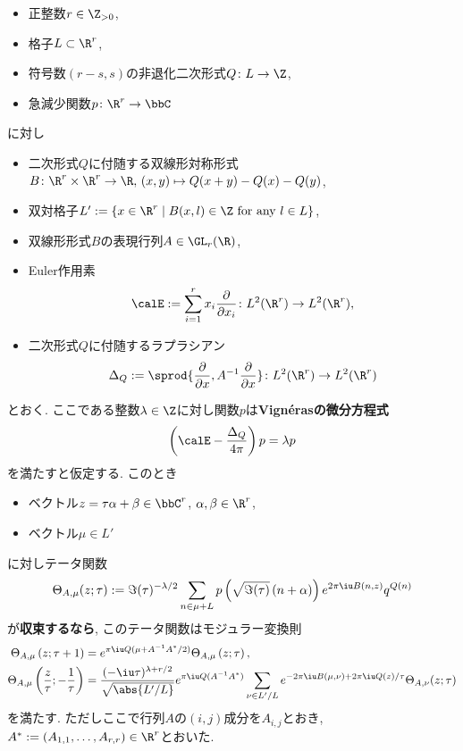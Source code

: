 \documentclass[11pt,b5paper,oneside,lualatex]{ltjsarticle} %
\numberwithin{equation}{section} %
\begin{document}
\begin{thm}
	\label{thm:Vigneras}
	\leavevmode %
	\begin{itemize}
		\item 正整数$ r \in \Z_{>0} $,
		\item 格子$ L \subset \R^r $,
		\item 符号数$ (r-s, s) $の非退化二次形式$ Q \colon L \to \Z $,
		\item 急減少関数$ p \colon \R^r \to \bbC $
	\end{itemize}
	に対し
	\begin{itemize}
		\item 二次形式$ Q $に付随する双線形対称形式$ B \colon \R^r \times \R^r \to \R, \, (x, y) \mapsto Q(x+y) - Q(x) - Q(y) $,
		\item 双対格子$ L' := \{ x \in \R^r \mid B(x, l) \in \Z \text{ for any } l \in L \} $,
		\item 双線形形式$ B $の表現行列$ A \in \GL_r(\R) $,
		\item Euler作用素
		\[
		\calE := \sum_{i=1}^{r} x_i \frac{\partial}{\partial x_i}
		\colon L^2(\R^r) \to L^2(\R^r),
		\]
		\item 二次形式$ Q $に付随するラプラシアン
		\[
		\Delta_Q := \sprod{ \frac{\partial}{\partial x}, A^{-1} \frac{\partial}{\partial x} }
		\colon L^2(\R^r) \to L^2(\R^r)
		\]
	\end{itemize}
	とおく. 
	ここである整数$ \lambda \in \Z $に対し関数$ p $は\textbf{Vign\'{e}rasの微分方程式}
	\[
	\left( \calE - \frac{\Delta_Q}{4\pi} \right) p = \lambda p
	\]
	を満たすと仮定する. 
	このとき
	\begin{itemize}
		\item ベクトル$ z = \tau \alpha + \beta \in \bbC^r $, $ \alpha, \beta \in \R^r $,
		\item ベクトル$ \mu \in L' $
	\end{itemize}
	に対しテータ関数
	\[
	\Theta_{A, \mu} (z; \tau)
	:=
	\Im(\tau)^{-\lambda/2}
	\sum_{n \in \mu + L} p\left( \sqrt{\Im(\tau)} \left( n + \alpha \right) \right)
	e^{2\pi\iu B(n, z)} q^{Q(n)}
	\]
	が\textbf{収束するなら}, このテータ関数はモジュラー変換則
	\begin{align}
		\Theta_{A, \mu} \left( z; \tau + 1 \right)
		&=
		e^{\pi\iu Q( \mu + A^{-1} A^* / 2)}
		\Theta_{A, \mu} \left( z; \tau \right),
		\\
		\Theta_{A, \mu} \left( \frac{z}{\tau}; -\frac{1}{\tau} \right)
		&=
		\frac{(-\iu \tau)^{\lambda + r/2}}{\sqrt{\abs{L'/L}}}
		e^{\pi\iu Q(A^{-1} A^*)}
		\sum_{\nu \in L'/L} e^{-2\pi\iu B(\mu, \nu) + 2\pi\iu Q(z) / \tau } 
		\Theta_{A, \nu} (z; \tau)
	\end{align}
	を満たす. 
	ただしここで行列$ A $の$ (i, j) $成分を$ A_{i, j} $とおき, $ A^* := (A_{1, 1}, \dots, A_{r, r}) \in \R^r $とおいた. 
\end{thm}
\end{document}

